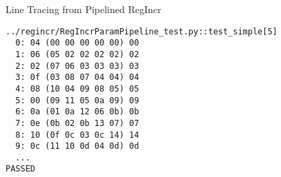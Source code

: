 \begin{frame}[fragile]{Line Tracing from Pipelined RegIncr}

\begin{Verbatim}
../regincr/RegIncrParamPipeline_test.py::test_simple[5]
  0: 04 (00 00 00 00 00) 00
  1: 06 (05 02 02 02 02) 02
  2: 02 (07 06 03 03 03) 03
  3: 0f (03 08 07 04 04) 04
  4: 08 (10 04 09 08 05) 05
  5: 00 (09 11 05 0a 09) 09
  6: 0a (01 0a 12 06 0b) 0b
  7: 0e (0b 02 0b 13 07) 07
  8: 10 (0f 0c 03 0c 14) 14
  9: 0c (11 10 0d 04 0d) 0d
  ...
PASSED
\end{Verbatim}

\end{frame}

